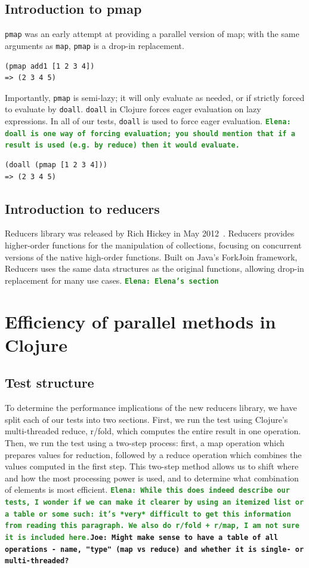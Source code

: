 \documentclass[12pt]{article}
\newcommand{\comment}[1]{{\bf \tt  {#1}}}
\newcommand{\emcomment}[1]{\textcolor{ForestGreen}{\comment{Elena: {#1}}}}
\newcommand{\joecomment}[1]{\textcolor{JoesGold}{\comment{Joe: {#1}}}}
\newcommand{\clocode}[1]{{\texttt {#1}}}
\begin{document}
\subsection{Introduction to pmap}\label{sec:pmap}
\clocode{pmap} was an early attempt at providing a parallel version of map; with the same arguments as \clocode{map}, \clocode{pmap} is a drop-in replacement. 
\begin{verbatim}
(pmap add1 [1 2 3 4])
=> (2 3 4 5)
\end{verbatim}
Importantly, \clocode{pmap} is semi-lazy; it will only evaluate as needed, or if strictly forced to evaluate by \clocode{doall}. \clocode{doall} in Clojure forces eager evaluation on lazy expressions. In all of our tests, \clocode{doall} is used to force eager evaluation. \emcomment{doall is one way of forcing evaluation; you should mention that if a result is used (e.g. by reduce) then it would evaluate. }
\begin{verbatim}
(doall (pmap [1 2 3 4])) 
=> (2 3 4 5)
\end{verbatim}

\subsection{Introduction to reducers}\label{sec:reducers}
Reducers library was released by Rich Hickey in May 2012~\cite{HickeyReducers}. Reducers provides higher-order functions for the manipulation of collections, focusing on concurrent versions of the native high-order functions.  Built on Java's ForkJoin framework, Reducers uses the same data structures as the original functions, allowing drop-in replacement for many use cases.
\emcomment{Elena's section}

\section{Efficiency of parallel methods in Clojure}\label{sec:efficiency} 

\subsection{Test structure}\label{sec:testStruct}
To determine the performance implications of the new reducers library, we have split each of our tests into two sections. First, we run the test using Clojure's multi-threaded reduce, r/fold, which computes the entire result in one operation. Then, we run the test using a two-step process: first, a map operation which prepares values for reduction, followed by a reduce operation which combines the values computed in the first step. This two-step method allows us to shift where and how the most processing power is used, and to determine what combination of elements is most efficient.
\emcomment{While this does indeed describe our tests, I wonder if we can make it clearer by using an itemized list or a table or some such: it's *very* difficult to get this information from reading this paragraph. We also do r/fold + r/map, I am not sure it is included here.}\joecomment{Might make sense to have a table of all operations - name, "type" (map vs reduce) and whether it is single- or multi-threaded?}
\end{document}
